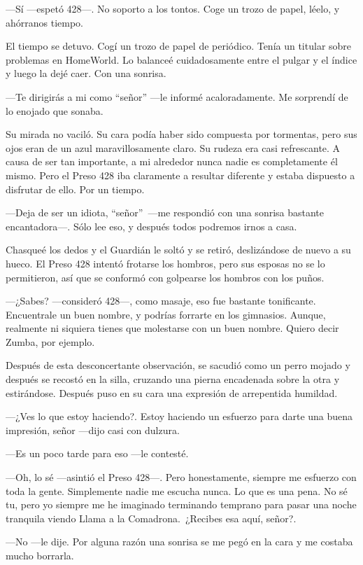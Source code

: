 ---Sí ---espetó 428---. No soporto a los tontos. Coge un trozo de papel,
léelo, y ahórranos tiempo.

El tiempo se detuvo. Cogí un trozo de papel de periódico. Tenía un
titular sobre problemas en HomeWorld. Lo balanceé cuidadosamente entre
el pulgar y el índice y luego la dejé caer. Con una sonrisa.

---Te dirigirás a mi como ``señor'' ---le informé acaloradamente. Me
sorprendí de lo enojado que sonaba.

Su mirada no vaciló. Su cara podía haber sido compuesta por tormentas,
pero sus ojos eran de un azul maravillosamente claro. Su rudeza era casi
refrescante. A causa de ser tan importante, a mi alrededor nunca nadie
es completamente él mismo. Pero el Preso 428 iba claramente a resultar
diferente y estaba dispuesto a disfrutar de ello. Por un tiempo.

---Deja de ser un idiota, ``señor''~---me respondió con una sonrisa
bastante encantadora---. Sólo lee eso, y después todos podremos irnos a
casa.

Chasqueé los dedos y el Guardián le soltó y se retiró, deslizándose de
nuevo a su hueco. El Preso 428 intentó frotarse los hombros, pero sus
esposas no se lo permitieron, así que se conformó con golpearse los
hombros con los puños.

---¿Sabes? ---consideró 428---, como masaje, eso fue bastante
tonificante. Encuentrale un buen nombre, y podrías forrarte en los
gimnasios. Aunque, realmente ni siquiera tienes que molestarse con un
buen nombre. Quiero decir Zumba, por ejemplo.

Después de esta desconcertante observación, se sacudió como un perro
mojado y después se recostó en la silla, cruzando una pierna encadenada
sobre la otra y estirándose. Después puso en su cara una expresión de
arrepentida humildad.

---¿Ves lo que estoy haciendo?. Estoy haciendo un esfuerzo para darte
una buena impresión, señor ---dijo casi con dulzura.

---Es un poco tarde para eso ---le contesté.

---Oh, lo sé ---asintió el Preso 428---. Pero honestamente, siempre me
esfuerzo con toda la gente. Simplemente nadie me escucha nunca. Lo que
es una pena. No sé tu, pero yo siempre me he imaginado terminando
temprano para pasar una noche tranquila viendo Llama a la
Comadrona.~¿Recibes esa aquí, señor?.

---No ---le dije. Por alguna razón una sonrisa se me pegó en la cara y
me costaba mucho borrarla.

